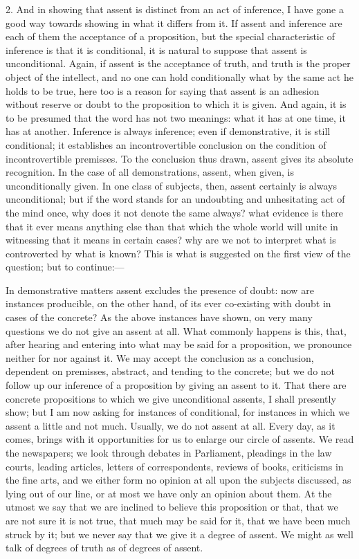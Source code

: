 2. And in showing that assent is distinct from an act of inference,
I have gone a good way towards showing in what it differs from it. If
assent and inference are each of them the acceptance of a proposition,
but the special characteristic of inference is that it is conditional,
it is natural to suppose that assent is unconditional. Again, if
assent is the acceptance of truth, and truth is the proper object of
the intellect, and no one can hold conditionally what by the same act
he holds to be true, here too is a reason for saying that assent is an
adhesion without reserve or doubt to the proposition to which it is
given. And again, it is to be presumed that the word has not two
meanings: what it has at one time, it has at another. Inference is
always inference; even if demonstrative, it is still conditional; it
establishes an incontrovertible conclusion on the condition of
incontrovertible premisses. To the conclusion thus drawn, assent gives
its absolute recognition. In the case of all demonstrations, assent,
when given, is unconditionally given. In one class of subjects, then,
assent certainly is always unconditional; but if the word stands
for an undoubting and unhesitating act of the mind once, why does it
not denote the same always? what evidence is there that it ever means
anything else than that which the whole world will unite in witnessing
that it means in certain cases? why are we not to interpret what is
controverted by what is known? This is what is suggested on the first
view of the question; but to continue:—

In demonstrative matters assent excludes the presence of doubt: now
are instances producible, on the other hand, of its ever co-existing
with doubt in cases of the concrete? As the above instances have
shown, on very many questions we do not give an assent at all. What
commonly happens is this, that, after hearing and entering into what
may be said for a proposition, we pronounce neither for nor against
it. We may accept the conclusion as a conclusion, dependent on
premisses, abstract, and tending to the concrete; but we do not follow
up our inference of a proposition by giving an assent to it. That
there are concrete propositions to which we give unconditional
assents, I shall presently show; but I am now asking for instances of
conditional, for instances in which we assent a little and not much.
Usually, we do not assent at all. Every day, as it comes, brings with
it opportunities for us to enlarge our circle of assents. We read the
newspapers; we look through debates in Parliament, pleadings in the
law courts, leading articles, letters of correspondents, reviews of
books, criticisms in the fine arts, and we either form no opinion at
all upon the subjects discussed, as lying out of our line, or at most
we have only an opinion about them. At the utmost we say that we
are inclined to believe this proposition or that, that we are not sure
it is not true, that much may be said for it, that we have been much
struck by it; but we never say that we give it a degree of assent. We
might as well talk of degrees of truth as of degrees of assent.

